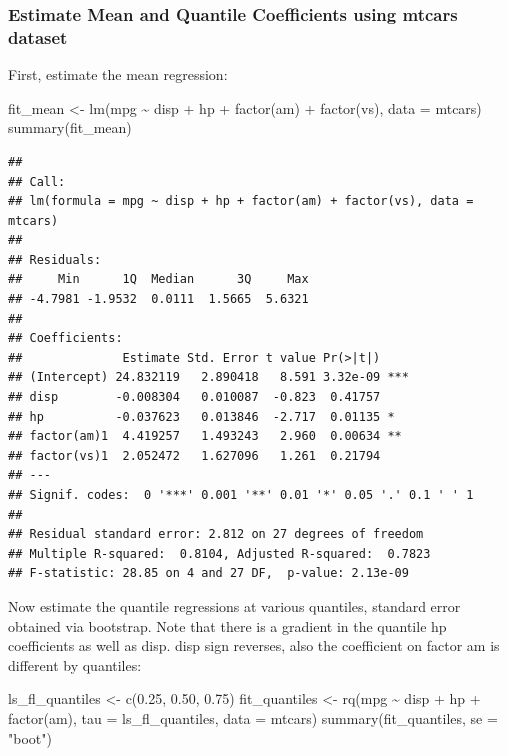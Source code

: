 \documentclass[
]{book}
\newenvironment{Shaded}{\begin{snugshade}}{\end{snugshade}}
\newcommand{\AttributeTok}[1]{\textcolor[rgb]{0.77,0.63,0.00}{#1}}
\newcommand{\FloatTok}[1]{\textcolor[rgb]{0.00,0.00,0.81}{#1}}
\newcommand{\FunctionTok}[1]{\textcolor[rgb]{0.00,0.00,0.00}{#1}}
\newcommand{\NormalTok}[1]{#1}
\newcommand{\OtherTok}[1]{\textcolor[rgb]{0.56,0.35,0.01}{#1}}
\newcommand{\SpecialCharTok}[1]{\textcolor[rgb]{0.00,0.00,0.00}{#1}}
\newcommand{\StringTok}[1]{\textcolor[rgb]{0.31,0.60,0.02}{#1}}
\begin{document}
\hypertarget{estimate-mean-and-quantile-coefficients-using-mtcars-dataset}{%
\subsubsection{Estimate Mean and Quantile Coefficients using mtcars dataset}\label{estimate-mean-and-quantile-coefficients-using-mtcars-dataset}}

First, estimate the mean regression:

\begin{Shaded}
\begin{Highlighting}[]
\NormalTok{fit\_mean }\OtherTok{\textless{}{-}} \FunctionTok{lm}\NormalTok{(mpg }\SpecialCharTok{\textasciitilde{}}\NormalTok{ disp }\SpecialCharTok{+}\NormalTok{ hp }\SpecialCharTok{+} \FunctionTok{factor}\NormalTok{(am) }\SpecialCharTok{+} \FunctionTok{factor}\NormalTok{(vs), }\AttributeTok{data =}\NormalTok{ mtcars)}
\FunctionTok{summary}\NormalTok{(fit\_mean)}
\end{Highlighting}
\end{Shaded}

\begin{verbatim}
## 
## Call:
## lm(formula = mpg ~ disp + hp + factor(am) + factor(vs), data = mtcars)
## 
## Residuals:
##     Min      1Q  Median      3Q     Max 
## -4.7981 -1.9532  0.0111  1.5665  5.6321 
## 
## Coefficients:
##              Estimate Std. Error t value Pr(>|t|)    
## (Intercept) 24.832119   2.890418   8.591 3.32e-09 ***
## disp        -0.008304   0.010087  -0.823  0.41757    
## hp          -0.037623   0.013846  -2.717  0.01135 *  
## factor(am)1  4.419257   1.493243   2.960  0.00634 ** 
## factor(vs)1  2.052472   1.627096   1.261  0.21794    
## ---
## Signif. codes:  0 '***' 0.001 '**' 0.01 '*' 0.05 '.' 0.1 ' ' 1
## 
## Residual standard error: 2.812 on 27 degrees of freedom
## Multiple R-squared:  0.8104, Adjusted R-squared:  0.7823 
## F-statistic: 28.85 on 4 and 27 DF,  p-value: 2.13e-09
\end{verbatim}

Now estimate the quantile regressions at various quantiles, standard error obtained via bootstrap. Note that there is a gradient in the quantile hp coefficients as well as disp. disp sign reverses, also the coefficient on factor am is different by quantiles:

\begin{Shaded}
\begin{Highlighting}[]
\NormalTok{ls\_fl\_quantiles }\OtherTok{\textless{}{-}} \FunctionTok{c}\NormalTok{(}\FloatTok{0.25}\NormalTok{, }\FloatTok{0.50}\NormalTok{, }\FloatTok{0.75}\NormalTok{)}
\NormalTok{fit\_quantiles }\OtherTok{\textless{}{-}} \FunctionTok{rq}\NormalTok{(mpg }\SpecialCharTok{\textasciitilde{}}\NormalTok{ disp }\SpecialCharTok{+}\NormalTok{ hp }\SpecialCharTok{+} \FunctionTok{factor}\NormalTok{(am),}
               \AttributeTok{tau =}\NormalTok{ ls\_fl\_quantiles,}
               \AttributeTok{data =}\NormalTok{ mtcars)}
\FunctionTok{summary}\NormalTok{(fit\_quantiles, }\AttributeTok{se =} \StringTok{"boot"}\NormalTok{)}
\end{Highlighting}
\end{Shaded}
\end{document}
